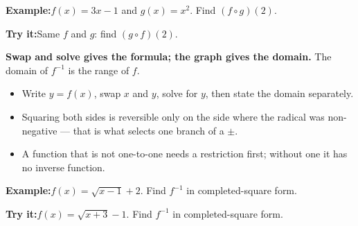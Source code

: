\documentclass[12pt]{article}
\begin{document}
\begin{examplebox}
\textbf{Example:}\quad $f(x) = 3x - 1$ and $g(x) = x^2$. Find $(f \circ g)(2)$.
\end{examplebox}

\begin{tryitbox}
\textbf{Try it:}\quad Same $f$ and $g$: find $(g \circ f)(2)$.\\[2pt]
\end{tryitbox}


\begin{formulabox}
\textbf{Swap and solve gives the formula; the graph gives the domain.} The domain of $f^{-1}$ is the range of $f$.
\begin{itemize}[leftmargin=0.8cm, itemsep=0pt, topsep=1pt]
  \item Write $y = f(x)$, swap $x$ and $y$, solve for $y$, then state the domain separately.
  \item Squaring both sides is reversible only on the side where the radical was non-negative --- that is what selects one branch of a $\pm$.
  \item A function that is not one-to-one needs a restriction first; without one it has no inverse function.
\end{itemize}
\end{formulabox}

\begin{examplebox}
\textbf{Example:}\quad $f(x) = \sqrt{x - 1} + 2$. Find $f^{-1}$ in completed-square form.
\end{examplebox}

\begin{tryitbox}
\textbf{Try it:}\quad $f(x) = \sqrt{x + 3} - 1$. Find $f^{-1}$ in completed-square form.\\[2pt]
\end{tryitbox}
\end{document}
